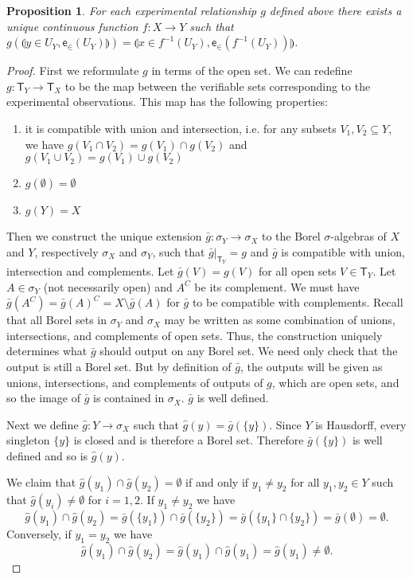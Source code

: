 \documentclass[preprint]{elsarticle}
\theoremstyle{plain}%
\newtheorem{prop}[thm]{Proposition}
\theoremstyle{definition}
\theoremstyle{remark}
\begin{document}
\begin{prop}
	For each experimental relationship $g$ defined above there exists a unique continuous function $f: X \rightarrow Y$ such that $g(\llparenthesis y\in U_Y,\mathsf{e}_{\in}(U_Y)\rrparenthesis) = \llparenthesis x\in f^{-1}(U_Y),\mathsf{e}_{\in}(f^{-1}(U_Y))\rrparenthesis$.
\end{prop}

\begin{proof}
	First we reformulate $g$ in terms of the open set. We can redefine $g: \mathsf{T}_Y \rightarrow \mathsf{T}_X$ to be the map between the verifiable sets corresponding to the experimental observations. This map has the following properties:
	\begin{enumerate}
		\item it is compatible with union and intersection, i.e. for any subsets $V_1, V_2 \subseteq Y$, we have $g(V_1 \cap V_2)=g(V_1)\cap g(V_2)$ and $g(V_1 \cup V_2)=g(V_1)\cup g(V_2)$
		\item $g(\emptyset) = \emptyset$
		\item $g(Y) = X$
	\end{enumerate}

	Then we construct the unique extension $\bar{g}:\sigma_Y\to\sigma_X$ to the Borel $\sigma$-algebras of $X$ and $Y$, respectively $\sigma_X$ and $\sigma_Y$, such that $\bar{g}|_{\mathsf{T}_Y}=g$ and $\bar{g}$ is compatible with union, intersection and complements. Let $\bar{g}(V) = g(V)$ for all open sets $V \in \mathsf{T}_Y$. Let $A \in \sigma_Y$ (not necessarily open) and $A^C$ be its complement. We must have $\bar{g}(A^C) = \bar{g}(A)^C = X\setminus \bar{g}(A)$ for $\bar{g}$ to be compatible with complements. Recall that all Borel sets in $\sigma_Y$ and $\sigma_X$ may be written as some combination of unions, intersections, and complements of open sets. Thus, the construction uniquely determines what $\bar{g}$ should output on any Borel set. We need only check that the output is still a Borel set. But by definition of $\bar{g}$, the outputs will be given as unions, intersections, and complements of outputs of $g$, which are open sets, and so the image of $\bar{g}$ is contained in $\sigma_X$.  $\bar{g}$ is well defined.
	
	Next we define $\hat{g}:Y\to\sigma_X$ such that $\hat{g}(y) = \bar{g}(\{y\})$. Since $Y$ is Hausdorff, every singleton $\{y\}$ is closed and is therefore a Borel set. Therefore $\bar{g}(\{y\})$ is well defined and so is $\hat{g}(y)$.
	
	We claim that $\hat{g}(y_1)\cap\hat{g}(y_2) = \emptyset$ if and only if $y_1\neq y_2$ for all $y_1,y_2\in Y$ such that $\hat{g}(y_i)\neq\emptyset$ for $i=1,2$. If $y_1\neq y_2$ we have
	$$
	\hat{g}(y_1)\cap\hat{g}(y_2) = \bar{g}(\{y_1\})\cap\bar{g}(\{y_2\}) = \bar{g}(\{y_1\}\cap\{y_2\}) = \bar{g}(\emptyset) = \emptyset.
	$$
	Conversely, if $y_1 = y_2$ we have
	$$
	\hat{g}(y_1)\cap\hat{g}(y_2) = 	\hat{g}(y_1)\cap\hat{g}(y_1) = 
	\hat{g}(y_1) \neq \emptyset.
	$$
	

\end{proof}
\end{document}
